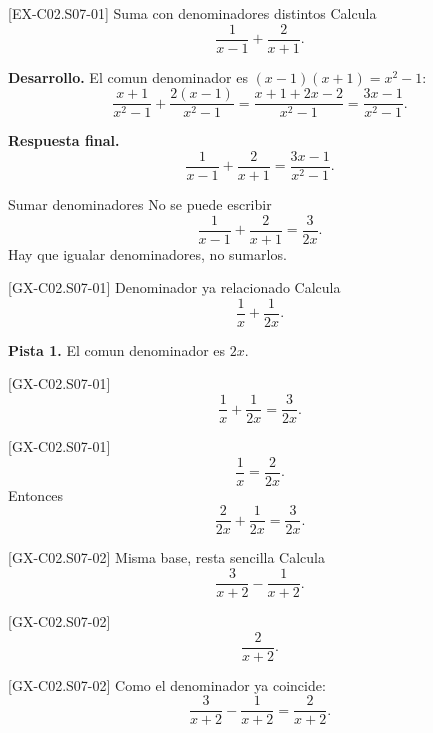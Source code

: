 \begin{solvedexample}{[EX-C02.S07-01] Suma con denominadores distintos}
Calcula
\[
\frac{1}{x-1}+\frac{2}{x+1}.
\]

\textbf{Desarrollo.} El comun denominador es \((x-1)(x+1)=x^2-1\):
\[
\frac{x+1}{x^2-1}+\frac{2(x-1)}{x^2-1}=
\frac{x+1+2x-2}{x^2-1}=
\frac{3x-1}{x^2-1}.
\]

\textbf{Respuesta final.}
\[
\frac{1}{x-1}+\frac{2}{x+1}=\frac{3x-1}{x^2-1}.
\]
\end{solvedexample}

\begin{commonerror}{Sumar denominadores}
No se puede escribir
\[
\frac{1}{x-1}+\frac{2}{x+1}=\frac{3}{2x}.
\]
Hay que igualar denominadores, no sumarlos.
\end{commonerror}

\begin{guidedexercise}{[GX-C02.S07-01] Denominador ya relacionado}
Calcula
\[
\frac{1}{x}+\frac{1}{2x}.
\]

\textbf{Pista 1.} El comun denominador es \(2x\).
\end{guidedexercise}

\begin{shortanswer}{[GX-C02.S07-01]}
\[
\frac{1}{x}+\frac{1}{2x}=\frac{3}{2x}.
\]
\end{shortanswer}

\begin{fullsolution}{[GX-C02.S07-01]}
\[
\frac{1}{x}=\frac{2}{2x}.
\]
Entonces
\[
\frac{2}{2x}+\frac{1}{2x}=\frac{3}{2x}.
\]
\end{fullsolution}

\begin{guidedexercise}{[GX-C02.S07-02] Misma base, resta sencilla}
Calcula
\[
\frac{3}{x+2}-\frac{1}{x+2}.
\]
\end{guidedexercise}

\begin{shortanswer}{[GX-C02.S07-02]}
\[
\frac{2}{x+2}.
\]
\end{shortanswer}

\begin{fullsolution}{[GX-C02.S07-02]}
Como el denominador ya coincide:
\[
\frac{3}{x+2}-\frac{1}{x+2}=\frac{2}{x+2}.
\]
\end{fullsolution}

